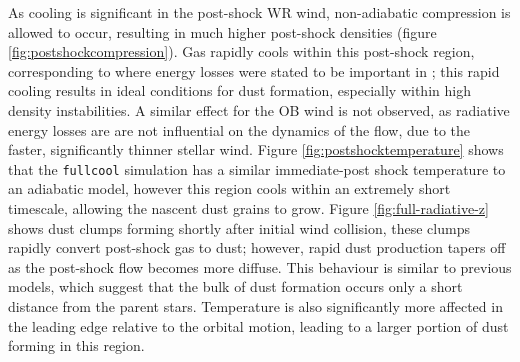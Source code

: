 As cooling is significant in the post-shock WR wind, non-adiabatic compression is allowed to occur, resulting in much higher post-shock densities (figure \ref{fig:postshockcompression}).
Gas rapidly cools within this post-shock region, corresponding to where energy losses were stated to be important in \textcite{usov_stellar_1991}; this rapid cooling results in ideal conditions for dust formation, especially within high density instabilities.
A similar effect for the OB wind is not observed, as radiative energy losses are are not influential on the dynamics of the flow, due to the faster, significantly thinner stellar wind.
Figure \ref{fig:postshocktemperature} shows that the \texttt{fullcool} simulation has a similar immediate-post shock temperature to an adiabatic model, however this region cools within an extremely short timescale, allowing the nascent dust grains to grow.
Figure \ref{fig:full-radiative-z} shows dust clumps forming shortly after initial wind collision, these clumps rapidly convert post-shock gas to dust; however, rapid dust production tapers off as the post-shock flow becomes more diffuse.
This behaviour is similar to previous models, which suggest that the bulk of dust formation occurs only a short distance from the parent stars.
Temperature is also significantly more affected in the leading edge relative to the orbital motion, leading to a larger portion of dust forming in this region.

